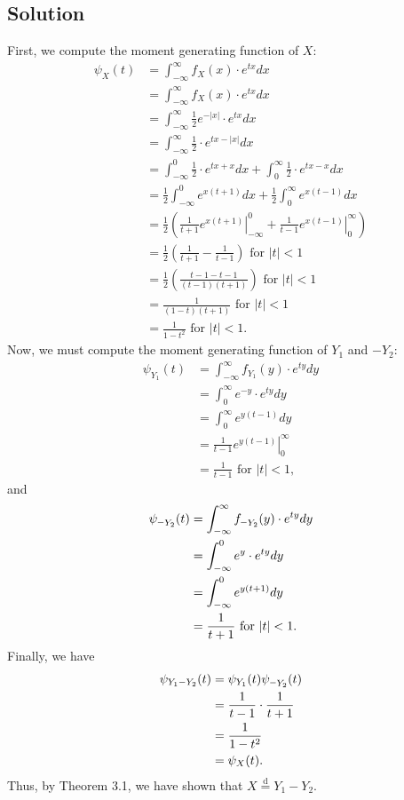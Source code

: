 \documentclass[10pt,a4paper]{article}
\theoremstyle{theorem}
\theoremstyle{definition}
\newcommand{\minus}{\scalebox{0.75}[1.0]{$-$}}
\begin{document}
\subsection*{Solution}
First, we compute the moment generating function of $X$:
\begin{align*}
\psi_X(t) &= \int_{-\infty}^\infty f_X(x) \cdot e^{tx} dx\\
&= \int_{-\infty}^\infty f_X(x) \cdot e^{tx} dx\\
&= \int_{-\infty}^\infty \frac{1}{2} e^{-|x|} \cdot e^{tx} dx\\
&= \int_{-\infty}^\infty \frac{1}{2} \cdot e^{tx - |x|} dx\\
&= \int_{-\infty}^0 \frac{1}{2} \cdot e^{tx +x} dx + \int_{0}^\infty \frac{1}{2} \cdot e^{tx - x} dx\\
&= \frac{1}{2} \int_{-\infty}^0  e^{x(t +1)} dx + \frac{1}{2} \int_{0}^\infty  e^{x(t - 1)} dx\\
&= \frac{1}{2} \left( \left. \frac{1}{t+1}  e^{x(t +1)}\right|_{-\infty}^0 + \left. \frac{1}{t - 1} e^{x(t -1)} \right|_0^\infty \right)\\
&= \frac{1}{2} \left( \frac{1}{t+1} - \frac{1}{t - 1} \right) \text{ for } |t| < 1\\
&= \frac{1}{2} \left( \frac{t - 1 - t - 1}{(t - 1)(t+1)} \right) \text{ for } |t| < 1 \\
&= \frac{1}{(1 - t)(t+1)} \text{ for } |t| < 1\\
&= \frac{1}{1 - t^2} \text{ for } |t| < 1.
\end{align*}
Now, we must compute the moment generating function of $Y_1$ and $-Y_2$:
\begin{align*}
\psi_{Y_1}(t) &= \int_{-\infty}^\infty f_{Y_1}(y) \cdot e^{ty} dy\\
&= \int_{0}^\infty e^{-y} \cdot e^{ty} dy\\
&= \int_{0}^\infty e^{y(t-1)} dy\\
&= \left. \frac{1}{t - 1} e^{y(t-1)} \right|_0^\infty\\
&= \frac{1}{t - 1} \text{ for } |t| < 1,
\end{align*}
and
\begin{align*}
\psi_{\minus Y_2}(t) &= \int_{-\infty}^\infty f_{\minus Y_2}(y) \cdot e^{ty} dy\\
&= \int_{-\infty}^0 e^y \cdot e^{ty} dy\\
&= \int_{-\infty}^0 e^{y(t+1)} dy\\
&= \frac{1}{t + 1} \text{ for } |t| < 1.
\end{align*}
Finally, we have
\begin{align*}
\psi_{Y_1 - Y_2}(t) &= \psi_{Y_1}(t)\psi_{\minus Y_2}(t)\\
&= \frac{1}{t - 1} \cdot \frac{1}{t + 1} \\
&= \frac{1}{1 - t^2}\\
&= \psi_X(t).
\end{align*}
Thus, by Theorem 3.1, we have shown that $X \stackrel{\text{d}}{=} Y_1 - Y_2$.
\end{document}
